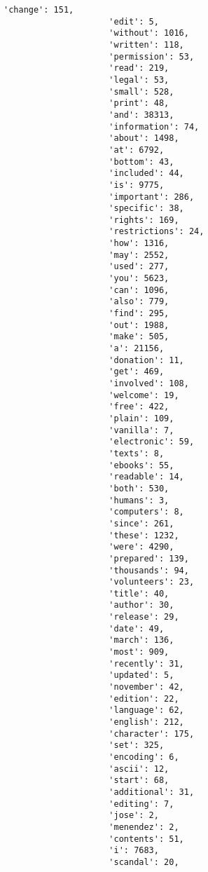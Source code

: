 \documentclass[11pt]{article}
\begin{document}
\begin{Verbatim}[commandchars=\\\{\}]
                     'change': 151,
                     'edit': 5,
                     'without': 1016,
                     'written': 118,
                     'permission': 53,
                     'read': 219,
                     'legal': 53,
                     'small': 528,
                     'print': 48,
                     'and': 38313,
                     'information': 74,
                     'about': 1498,
                     'at': 6792,
                     'bottom': 43,
                     'included': 44,
                     'is': 9775,
                     'important': 286,
                     'specific': 38,
                     'rights': 169,
                     'restrictions': 24,
                     'how': 1316,
                     'may': 2552,
                     'used': 277,
                     'you': 5623,
                     'can': 1096,
                     'also': 779,
                     'find': 295,
                     'out': 1988,
                     'make': 505,
                     'a': 21156,
                     'donation': 11,
                     'get': 469,
                     'involved': 108,
                     'welcome': 19,
                     'free': 422,
                     'plain': 109,
                     'vanilla': 7,
                     'electronic': 59,
                     'texts': 8,
                     'ebooks': 55,
                     'readable': 14,
                     'both': 530,
                     'humans': 3,
                     'computers': 8,
                     'since': 261,
                     'these': 1232,
                     'were': 4290,
                     'prepared': 139,
                     'thousands': 94,
                     'volunteers': 23,
                     'title': 40,
                     'author': 30,
                     'release': 29,
                     'date': 49,
                     'march': 136,
                     'most': 909,
                     'recently': 31,
                     'updated': 5,
                     'november': 42,
                     'edition': 22,
                     'language': 62,
                     'english': 212,
                     'character': 175,
                     'set': 325,
                     'encoding': 6,
                     'ascii': 12,
                     'start': 68,
                     'additional': 31,
                     'editing': 7,
                     'jose': 2,
                     'menendez': 2,
                     'contents': 51,
                     'i': 7683,
                     'scandal': 20,

\end{Verbatim}
\end{document}
